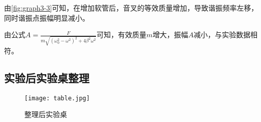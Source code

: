 \documentclass[dvipsnames, svgnames,a4paper,11pt]{article}
\begin{document}
	\begin{figure}[htbp]
		\centering
		\quad

	\end{figure}



	由\cref{fig:graph3-3}可知，在增加软管后，音叉的等效质量增加，导致谐振频率左移，同时谐振点振幅明显减小。

	由公式$A=\frac{F}{m\sqrt{(\omega_0^2-\omega^2)^2+4\beta^2\omega^2}}$可知，有效质量$m$增大，振幅$A$减小，与实验数据相符。			
			
			
			

	
\subsection{实验后实验桌整理}

\begin{figure}[H]
	\centering
	\texttt{[image: table.jpg]}
	\caption{整理后实验桌}
\end{figure}
	
\end{document}
